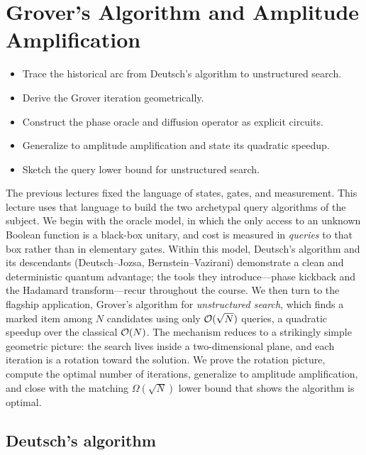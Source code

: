 \chapter{Grover's Algorithm and Amplitude Amplification}
\label{ch:lec03}

\begin{objectives}
\begin{itemize}[leftmargin=1.4em,nosep]
  \item Trace the historical arc from Deutsch's algorithm to unstructured search.
  \item Derive the Grover iteration geometrically.
  \item Construct the phase oracle and diffusion operator as explicit circuits.
  \item Generalize to amplitude amplification and state its quadratic speedup.
  \item Sketch the query lower bound for unstructured search.
\end{itemize}
\end{objectives}


The previous lectures fixed the language of states, gates, and measurement. This
lecture uses that language to build the two archetypal query algorithms of the
subject. We begin with the oracle model, in which the only access to an unknown
Boolean function is a black-box unitary, and cost is measured in \emph{queries}
to that box rather than in elementary gates. Within this model, Deutsch's
algorithm and its descendants (Deutsch--Jozsa, Bernstein--Vazirani) demonstrate a
clean and deterministic quantum advantage; the tools they introduce---phase
kickback and the Hadamard transform---recur throughout the course. We then turn
to the flagship application, Grover's algorithm for \emph{unstructured search},
which finds a marked item among $N$ candidates using only $\mathcal{O}(\sqrt N)$
queries, a quadratic speedup over the classical $\mathcal{O}(N)$. The mechanism reduces
to a strikingly simple geometric picture: the search lives inside a
two-dimensional plane, and each iteration is a rotation toward the solution. We
prove the rotation picture, compute the optimal number of iterations, generalize
to amplitude amplification, and close with the matching $\Omega(\sqrt N)$ lower
bound that shows the algorithm is optimal.

\section{Deutsch's algorithm}
\label{sec:lec03-1}

